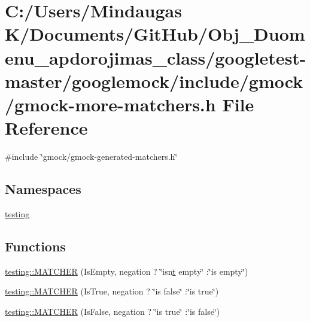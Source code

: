\hypertarget{googletest-master_2googlemock_2include_2gmock_2gmock-more-matchers_8h}{}\section{C\+:/\+Users/\+Mindaugas K/\+Documents/\+Git\+Hub/\+Obj\+\_\+\+Duomenu\+\_\+apdorojimas\+\_\+class/googletest-\/master/googlemock/include/gmock/gmock-\/more-\/matchers.h File Reference}
\label{googletest-master_2googlemock_2include_2gmock_2gmock-more-matchers_8h}
{\ttfamily \#include \char`\"{}gmock/gmock-\/generated-\/matchers.\+h\char`\"{}}\newline
\subsection*{Namespaces}
\begin{DoxyCompactItemize}
\item 
 \mbox{\hyperlink{namespacetesting}{testing}}
\end{DoxyCompactItemize}
\subsection*{Functions}
\begin{DoxyCompactItemize}
\item 
\mbox{\hyperlink{namespacetesting_a4fcb3f407119590471bea5a90a8d2dda}{testing\+::\+M\+A\+T\+C\+H\+ER}} (Is\+Empty, negation ? \char`\"{}isn\textquotesingle{}\mbox{\hyperlink{_mutual_8h_a978d88b393c8a37dc2614c88788b3442}{t}} empty\char`\"{} \+:\char`\"{}is empty\char`\"{})
\item 
\mbox{\hyperlink{namespacetesting_ab2b645db6909220993662cf43ed0d9e8}{testing\+::\+M\+A\+T\+C\+H\+ER}} (Is\+True, negation ? \char`\"{}is false\char`\"{} \+:\char`\"{}is true\char`\"{})
\item 
\mbox{\hyperlink{namespacetesting_a03fb223cceaefc67991ac36286dcbb34}{testing\+::\+M\+A\+T\+C\+H\+ER}} (Is\+False, negation ? \char`\"{}is true\char`\"{} \+:\char`\"{}is false\char`\"{})
\end{DoxyCompactItemize}
